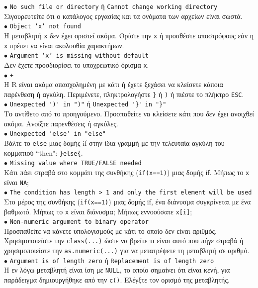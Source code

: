 \documentclass[a4paper,10pt,twocolumn]{article}
\begin{document}
\noindent $\bullet$ \texttt{No such file or directory} ή \texttt{Cannot change working directory} \\
Σιγουρευτείτε ότι ο κατάλογος εργασίας και τα ονόματα των αρχείων είναι σωστά.\\
\noindent $\bullet$ \texttt{Object `x' not found}\\
Η μεταβλητή \texttt{x} δεν έχει οριστεί ακόμα. Ορίστε την \texttt{x} ή προσθέστε αποστρόφους εάν η \texttt{x}
πρέπει να είναι ακολουθία χαρακτήρων.\\
\noindent $\bullet$ \texttt{Argument `x' is missing without default}\\
Δεν έχετε προσδιορίσει το υποχρεωτικό όρισμα \texttt{x}.\\
\noindent $\bullet$ \texttt{+}\\ %
Η R είναι ακόμα απασχολημένη με κάτι ή έχετε ξεχάσει να κλείσετε κάποια παρένθεση ή αγκύλη. Περιμένετε,
πληκτρολογήστε \verb!}! ή \verb!)! ή πιέστε το πλήκτρο \texttt{ESC}.\\ 
\noindent $\bullet$ \verb!Unexpected ')' in ")"! ή \verb!Unexpected '}'! \verb!in "}"!\\ 
Το αντίθετο από το προηγούμενο. Προσπαθείτε να κλείσετε κάτι που δεν έχει ανοιχθεί ακόμα. Ανοίξτε παρενθέσεις ή 
αγκύλες.\\
\noindent $\bullet$ \texttt{Unexpected `else' in "else"}\\
Βάλτε το \verb!else! μιας δομής if στην ίδια γραμμή με την τελευταία αγκύλη του κομματιού ``then":
\verb!}else{!.\\
\noindent $\bullet$ \texttt{Missing value where TRUE/FALSE needed}\\
Κάτι πάει στραβά στο κομμάτι της συνθήκης (\texttt{if(x==1)}) μιας δομής if. Μήπως το \texttt{x} είναι
\texttt{NA}; \\
\noindent $\bullet$ \texttt{The condition has length > 1 and only the first element will be used}\\
Στο μέρος της συνθήκης (\texttt{if(x==1)}) μιας δομής if, ένα διάνυσμα συγκρίνεται με ένα βαθμωτό. Μήπως το
\texttt{x} είναι διάνυσμα; Μήπως εννοούσατε \texttt{x[i]};\\
\noindent $\bullet$ \texttt{Non-numeric argument to binary operator} \\
Προσπαθείτε να κάνετε υπολογισμούς με κάτι το οποίο δεν είναι αριθμός. Χρησιμοποιείστε την \texttt{class(...)}
ώστε να βρείτε τι είναι αυτό που πήγε στραβά ή χρησιμοποιείστε την \texttt{as.numeric(...)} για να μετατρέψετε
τη μεταβλητή σε αριθμό.\\
\noindent $\bullet$ \texttt{Argument is of length zero} ή \texttt{Replacement is of length zero}\\
Η εν λόγω μεταβλητή είναι ίση με \texttt{NULL}, το οποίο σημαίνει ότι είναι κενή, για παράδειγμα δημιουργήθηκε
από την \texttt{c()}. Ελέγξτε τον ορισμό της μεταβλητής.
\end{document}
